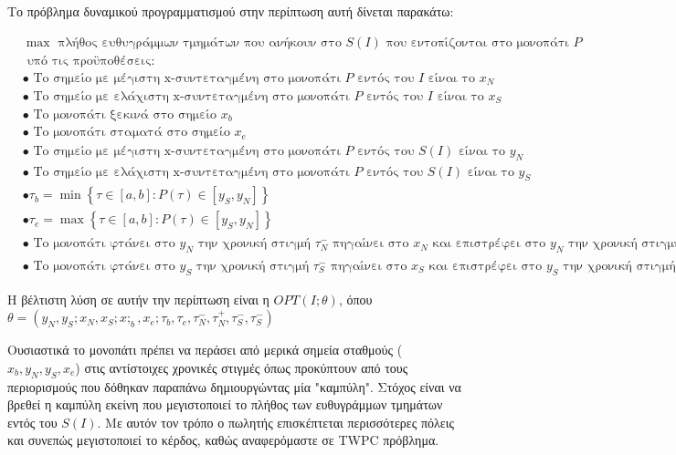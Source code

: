 \documentclass[oneside,12pt]{book}
\theoremstyle{definition}
\begin{document}
Το πρόβλημα δυναμικού προγραμματισμού στην περίπτωση αυτή δίνεται παρακάτω:

\begin{align*}
&\max \text{ πλήθος ευθυγράμμων τμημάτων που ανήκουν στο } S(I) \text{ που εντοπίζονται στο μονοπάτι } P \\
&\text{ υπό τις προϋποθέσεις:} \\
&\bullet \text{ Το σημείο με μέγιστη x-συντεταγμένη στο μονοπάτι } P \text{ εντός του } Ι \text{ είναι το } x_N  \\
&\bullet \text{ Το σημείο με ελάχιστη x-συντεταγμένη στο μονοπάτι } P \text{ εντός του } Ι \text{ είναι το } x_S  \\
&\bullet \text{ Το μονοπάτι ξεκινά στο σημείο } x_b \\
&\bullet \text{ Το μονοπάτι σταματά στο σημείο } x_e \\
&\bullet \text{ Το σημείο με μέγιστη x-συντεταγμένη στο μονοπάτι } P \text{ εντός του } S(I) \text{ είναι το } y_N  \\
&\bullet \text{ Το σημείο με ελάχιστη x-συντεταγμένη στο μονοπάτι } P \text{ εντός του } S(I) \text{ είναι το } y_S  \\
&\bullet τ_b = \min \left\{ τ \in [a,b] : P(τ) \in [y_S, y_N] \right\}  \\
&\bullet τ_e = \max \left\{ τ \in [a,b] : P(τ) \in [y_S, y_N] \right\}  \\
&\bullet \text{ Το μονοπάτι φτάνει στο } y_N \text{ την χρονική στιγμή } τ_{N}^{-} \text{ πηγαίνει στο } x_N \text{ και επιστρέφει στο } y_N \text{ την χρονική στιγμή } τ_{N}^{+} \\
&\bullet \text{ Το μονοπάτι φτάνει στο } y_S \text{ την χρονική στιγμή } τ_{S}^{-} \text{ πηγαίνει στο } x_S \text{ και επιστρέφει στο } y_S \text{ την χρονική στιγμή } τ_{S}^{+} 
\end{align*} 

Η βέλτιστη λύση σε αυτήν την περίπτωση είναι η \(OPT(I;θ)\), όπου \\ \(θ = (y_N, y_S; x_N, x_S; x;_b, x_e; τ_b, τ_e, τ_{N}^{-} ,τ_{N}^{+}, τ_{S}^{-}, τ_{S}^{-})\)

Ουσιαστικά το μονοπάτι πρέπει να περάσει από μερικά σημεία σταθμούς (\(x_b, y_N, y_S, x_e\)) στις αντίστοιχες χρονικές στιγμές όπως προκύπτουν από τους περιορισμούς που δόθηκαν παραπάνω δημιουργώντας μία "καμπύλη". Στόχος είναι να βρεθεί η καμπύλη εκείνη που μεγιστοποιεί το πλήθος των ευθυγράμμων τμημάτων εντός του \(S(I)\). Με αυτόν τον τρόπο ο πωλητής επισκέπτεται περισσότερες πόλεις και συνεπώς μεγιστοποιεί το κέρδος, καθώς αναφερόμαστε σε TWPC πρόβλημα. \\
\end{document}
